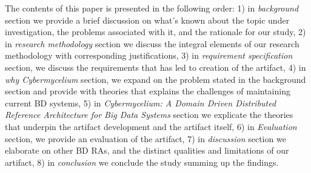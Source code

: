 \documentclass[review]{elsarticle}
\begin{document}
The contents of this paper is presented in the following order: 1) in \emph{background} section we provide a brief discussion on what's known about the topic under investigation, the problems associated with it, and the rationale for our study, 2) in \emph{research methodology} section we discuss the integral elements of our research methodology with corresponding justifications, 3) in \emph{requirement specification} section, we discuss the requirements that has led to creation of the artifact, 4) in \emph{why Cybermycelium} section, we expand on the problem stated in the background section and provide with theories that explains the challenges of maintaining current BD systems, 5) in \emph{Cybermycelium: A Domain Driven Distributed Reference Architecture for Big Data Systems} section we explicate the theories that underpin the artifact development and the artifact itself, 6) in \emph{Evaluation} section, we provide an evaluation of the artifact, 7) in \emph{discussion} section we elaborate on other BD RAs, and the distinct qualities and limitations of our artifact, 8) in \emph{conclusion} we conclude the study summing up the findings.





\end{document}
